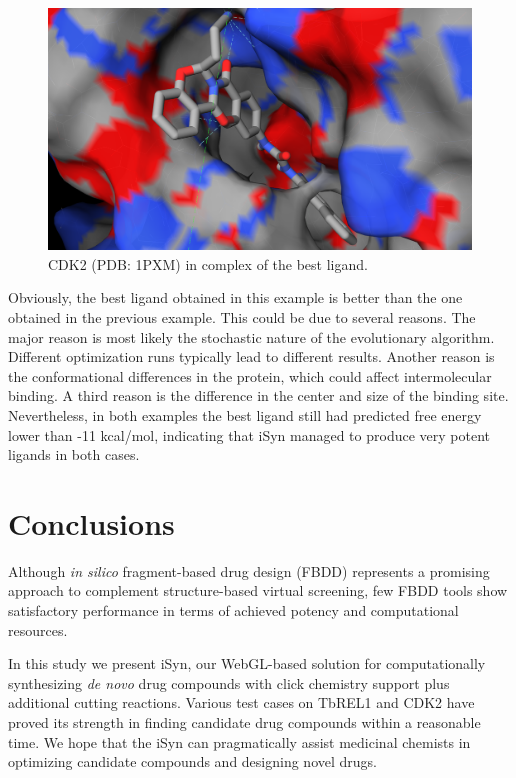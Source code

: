 \begin{figure}
\begin{center}
\includegraphics[width=\linewidth]{../isyn/1PXM.png}
\end{center}
\caption{CDK2 (PDB: 1PXM) in complex of the best ligand.}
\label{fig:1PXM}
\end{figure}

Obviously, the best ligand obtained in this example is better than the one obtained in the previous example. This could be due to several reasons. The major reason is most likely the stochastic nature of the evolutionary algorithm. Different optimization runs typically lead to different results. Another reason is the conformational differences in the protein, which could affect intermolecular binding. A third reason is the difference in the center and size of the binding site. Nevertheless, in both examples the best ligand still had predicted free energy lower than -11 kcal/mol, indicating that iSyn managed to produce very potent ligands in both cases.

\section{Conclusions}

Although \textit{in silico} fragment-based drug design (FBDD) represents a promising approach to complement structure-based virtual screening, few FBDD tools show satisfactory performance in terms of achieved potency and computational resources.

In this study we present iSyn, our WebGL-based solution for computationally synthesizing \textit{de novo} drug compounds with click chemistry support plus additional cutting reactions. Various test cases on TbREL1 and CDK2 have proved its strength in finding candidate drug compounds within a reasonable time. We hope that the iSyn can pragmatically assist medicinal chemists in optimizing candidate compounds and designing novel drugs.

